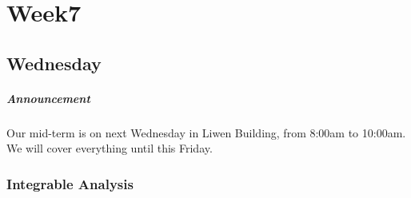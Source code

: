 
\chapter{Week7}

\section{Wednesday}
\paragraph{Announcement}
Our mid-term is on next Wednesday in Liwen Building, from 8:00am to 10:00am. We will cover everything until this Friday.
\subsection{Integrable Analysis}
